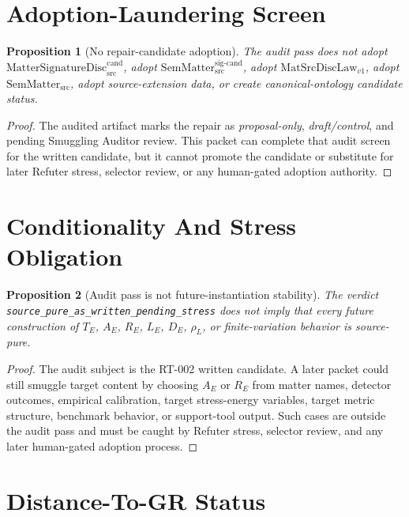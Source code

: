 \documentclass[11pt]{article}
\newcommand{\MatSrcDiscLaw}{\mathrm{MatSrcDiscLaw}_{v1}}
\newcommand{\SemMatterSrc}{\mathrm{SemMatter}_{\mathrm{src}}}
\newcommand{\SemMatterSig}{\mathrm{SemMatter}_{\mathrm{src}}^{\mathrm{sig\text{-}cand}}}
\newcommand{\MatSigDisc}{\mathrm{MatterSignatureDisc}_{\mathrm{src}}^{\mathrm{cand}}}
\newtheorem{proposition}{Proposition}
\begin{document}
\section{Adoption-Laundering Screen}

\begin{proposition}[No repair-candidate adoption]
The audit pass does not adopt \(\MatSigDisc\), adopt \(\SemMatterSig\), adopt
\(\MatSrcDiscLaw\), adopt \(\SemMatterSrc\), adopt source-extension data, or
create canonical-ontology candidate status.
\end{proposition}

\begin{proof}
The audited artifact marks the repair as \emph{proposal-only},
\emph{draft/control}, and pending Smuggling Auditor review. This packet can
complete that audit screen for the written candidate, but it cannot promote
the candidate or substitute for later Refuter stress, selector review, or any
human-gated adoption authority.
\end{proof}

\section{Conditionality And Stress Obligation}

\begin{proposition}[Audit pass is not future-instantiation stability]
The verdict \texttt{source\_pure\_as\_written\_pending\_stress} does not imply
that every future construction of \(T_E\), \(A_E\), \(R_E\), \(L_E\), \(D_E\),
\(\rho_L\), or finite-variation behavior is source-pure.
\end{proposition}

\begin{proof}
The audit subject is the RT-002 written candidate. A later packet could still
smuggle target content by choosing \(A_E\) or \(R_E\) from matter names,
detector outcomes, empirical calibration, target stress-energy variables,
target metric structure, benchmark behavior, or support-tool output. Such
cases are outside the audit pass and must be caught by Refuter stress,
selector review, and any later human-gated adoption process.
\end{proof}

\section{Distance-To-GR Status}
\end{document}
